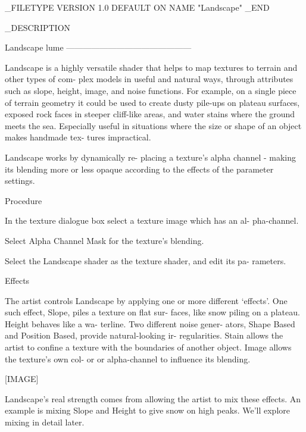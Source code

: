 _FILETYPE
VERSION	 1.0
DEFAULT	 ON
NAME	"Landscape"
_END


_DESCRIPTION


Landscape                                lume
---------------------------------------------


       Landscape is a highly versatile
       shader that helps to map textures
       to terrain and other types of com-
       plex models in useful and natural
       ways, through attributes such as
       slope, height, image, and noise
       functions. For example, on a single
       piece of terrain geometry it could
       be used to create dusty pile-ups on
       plateau surfaces, exposed rock
       faces in steeper cliff-like areas,
       and water stains where the ground
       meets the sea. Especially useful in
       situations where the size or shape
       of an object makes handmade tex-
       tures impractical.

       Landscape works by dynamically re-
       placing a texture's alpha channel -
       making its blending more or less
       opaque according to the effects of
       the parameter settings.



  Procedure

        In the texture dialogue box select
        a texture image which has an al-
        pha-channel.

        Select Alpha Channel Mask for the
        texture's blending.

        Select the Landscape shader as the
        texture shader, and edit its pa-
        rameters.



  Effects

       The artist controls Landscape by
       applying one or more different
       `effects'. One such effect,
       Slope, piles a texture on flat sur-
       faces, like snow piling on a
       plateau. Height behaves like a wa-
       terline. Two different noise gener-
       ators, Shape Based and Position
       Based, provide natural-looking ir-
       regularities. Stain allows the
       artist to confine a texture with
       the boundaries of another object.
       Image allows the texture's own col-
       or or alpha-channel to influence
       its blending.

       [IMAGE]

       Landscape's real strength comes
       from allowing the artist to mix
       these effects. An example is mixing
       Slope and Height to give snow on
       high peaks. We'll explore mixing in
       detail later.



